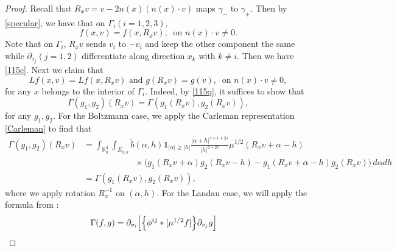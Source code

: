 \documentclass[reqno,a4paper]{amsart}
\numberwithin{equation}{section}
\newcommand{\1}{\mathbf{1}}
\newcommand{\R}{\mathbb{R}}
\newcommand{\<}{\langle}
\renewcommand{\>}{\rangle}
\begin{document}
\begin{proof}
	Recall that $R_xv=v-2n(x)(n(x)\cdot v)$ maps $\gamma_-$ to $\gamma_+$. Then by \eqref{specular}, we have that on $\Gamma_i$$(i=1,2,3)$, 
	\begin{equation*}
		f(x,v)=f(x,R_xv),\ \text{ on } n(x)\cdot v\neq 0.
	\end{equation*}
	Note that on $\Gamma_i$, $R_xv$ sends $v_i$ to $-v_i$ and keep the other component the same while $\partial_{\tau_j}(j=1,2)$ differentiate along direction $x_k$ with $k\neq i$. Then we have 
	\eqref{115c}. 
	Next we claim that 
	\begin{equation}\label{2.10}
		Lf(x,v)=Lf(x,R_xv)\text{ and }g(R_xv)=g(v),\ \text{ on } n(x)\cdot v\neq 0,
	\end{equation}for any $x$ belongs to the interior of $\Gamma_i$. 
	Indeed, by \eqref{115q}, it suffices to show that 
	\begin{equation*}
		\Gamma(g_1,g_2)(R_xv)=\Gamma(g_1(R_xv),g_2(R_xv)),
	\end{equation*} for any $g_1,g_2$.
	For the Boltzmann case, we apply the Carleman representation \eqref{Carleman} to find that 
	\begin{align*}
		\Gamma(g_1,g_2)(R_xv) &= \int_{\R^3_h}\int_{E_{0,h}}\tilde{b}(\alpha,h)\1_{|\alpha|\ge|h|}\frac{|\alpha+h|^{\gamma+1+2s}}{|h|^{3+2s}}\mu^{1/2}(R_xv+\alpha-h)\\&\qquad\qquad\qquad\times\big(g_1(R_xv+\alpha)g_2(R_xv-h)-g_1(R_xv+\alpha-h)g_2(R_xv)\big)\,d\alpha dh\\ &=\Gamma(g_1(R_xv),g_2(R_xv)),
	\end{align*}where we apply rotation $R_x^{-1}$ on $(\alpha,h)$. 
	For the Landau case, we will apply the formula from \cite[Lemma 1]{Guo2002a}:
	\begin{align}
		\label{Landau}\notag
		\Gamma(f,g) &= \partial_{v_i}\Big[\Big\{\phi^{ij}*[\mu^{1/2}f]\Big\}\partial_{v_j}g\Big]

\end{align}$$
\end{proof}
\end{document}

